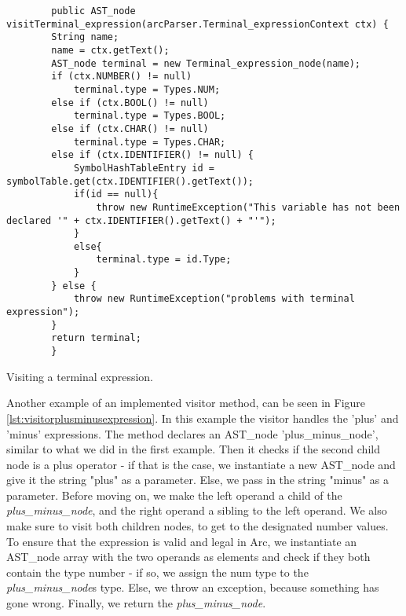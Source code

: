 \begin{listing}[htb!]
    \begin{verbatim}
        public AST_node visitTerminal_expression(arcParser.Terminal_expressionContext ctx) {
        String name;
        name = ctx.getText();
        AST_node terminal = new Terminal_expression_node(name);
        if (ctx.NUMBER() != null)
            terminal.type = Types.NUM;
        else if (ctx.BOOL() != null)
            terminal.type = Types.BOOL;
        else if (ctx.CHAR() != null)
            terminal.type = Types.CHAR;
        else if (ctx.IDENTIFIER() != null) {
            SymbolHashTableEntry id = symbolTable.get(ctx.IDENTIFIER().getText());
            if(id == null){
                throw new RuntimeException("This variable has not been declared '" + ctx.IDENTIFIER().getText() + "'");
            }
            else{
                terminal.type = id.Type;
            }
        } else {
            throw new RuntimeException("problems with terminal expression");
        }
        return terminal;
        }
    \end{verbatim}
    \caption{Visiting a terminal expression.}
    \label{lst:visitorterminalexpression}
\end{listing}

Another example of an implemented visitor method, can be seen in Figure \ref{lst:visitorplusminusexpression}. In this example the visitor handles the 'plus' and 'minus' expressions. The method declares an AST\_node 'plus\_minus\_node', similar to what we did in the first example. Then it checks if the second child node is a plus operator - if that is the case, we instantiate a new AST\_node and give it the string "plus" as a parameter. Else, we pass in the string "minus" as a parameter. Before moving on, we make the left operand a child of the \textit{plus_minus_node}, and the right operand a sibling to the left operand. We also make sure to visit both children nodes, to get to the designated number values. To ensure that the expression is valid and legal in Arc, we instantiate an AST\_node array with the two operands as elements and check if they both contain the type number - if so, we assign the num type to the \textit{plus_minus_node}s type. Else, we throw an exception, because something has gone wrong. Finally, we return the \textit{plus_minus_node}.

